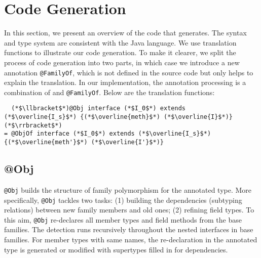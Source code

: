 \section{Code Generation}


In this section, we present an overview of the code that \name generates. The syntax and type system are
consistent with the Java language. We use translation functions to illustrate our code generation.
To make it clearer, we split the process of code generation into two parts, in which case we introduce a
new annotation \lstinline{@FamilyOf}, which is not defined in the source code but only helps to explain
the translation. In our implementation, the annotation processing is a combination of \name
and \lstinline{@FamilyOf}. Below are the translation functions:

\begin{lstlisting}
  (*$\llbracket$*)@Obj interface (*$I_0$*) extends (*$\overline{I_s}$*) {(*$\overline{meth}$*) (*$\overline{I}$*)}(*$\rrbracket$*)
= @ObjOf interface (*$I_0$*) extends (*$\overline{I_s}$*) {(*$\overline{meth'}$*) (*$\overline{I'}$*)}
\end{lstlisting}

\subsection{@Obj}
\lstinline{@Obj} builds the structure of family polymorphism for the annotated type. More specifically, \lstinline{@Obj} tackles two
tasks: (1) building the dependencies (subtyping relations) between new family members and old ones; (2) refining field types. To this
aim, \lstinline{@Obj} re-declares all member types and field methods from the base families. The detection runs recursively throughout
the nested interfaces in base families. For member types with same names, the re-declaration in the annotated type is generated or modified
with supertypes filled in for dependencies.

